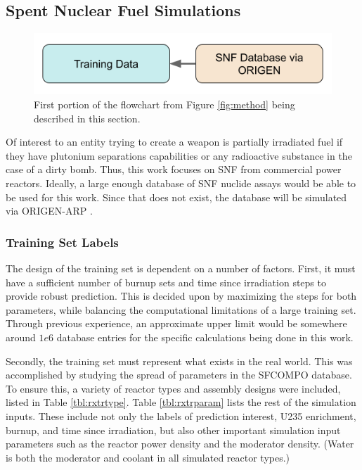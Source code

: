 \subsection{Spent Nuclear Fuel Simulations}
\label{sec:snfsim}

\begin{figure}[H]
  \centering
  \includegraphics[width=0.7\linewidth]{./chapters/method/methodology1.png}
  \caption{First portion of the flowchart from Figure \ref{fig:method} being 
           described in this section.}
\end{figure}

Of interest to an entity trying to create a weapon is partially irradiated fuel
if they have plutonium separations capabilities or any radioactive substance in
the case of a dirty bomb. Thus, this work focuses on \gls{SNF} from commercial
power reactors. Ideally, a large enough database of \gls{SNF} nuclide assays
would be able to be used for this work. Since that does not exist, the 
database will be simulated via \gls{ORIGEN-ARP} \cite{origen, origenarp}.  

\subsubsection{Training Set Labels}
\label{sec:snflbls}

The design of the training set is dependent on a number of factors.  First, it
must have a sufficient number of burnup sets and time since irradiation steps
to provide robust prediction. This is decided upon by maximizing the steps for
both parameters, while balancing the computational limitations of a large
training set. Through previous experience, an approximate upper limit would be
somewhere around $1e6$ database entries for the specific calculations being
done in this work.

Secondly, the training set must represent what exists in the real world. This
was accomplished by studying the spread of parameters in the \gls{SFCOMPO}
database.  To ensure this, a variety of reactor types and assembly designs were
included, listed in Table \ref{tbl:rxtrtype}. Table \ref{tbl:rxtrparam} lists
the rest of the simulation inputs. These include not only the labels of
prediction interest, \gls{U235} enrichment, burnup, and time since irradiation,
but also other important simulation input parameters such as the reactor power
density and the moderator density.  (Water is both the moderator and coolant in
all simulated reactor types.)


